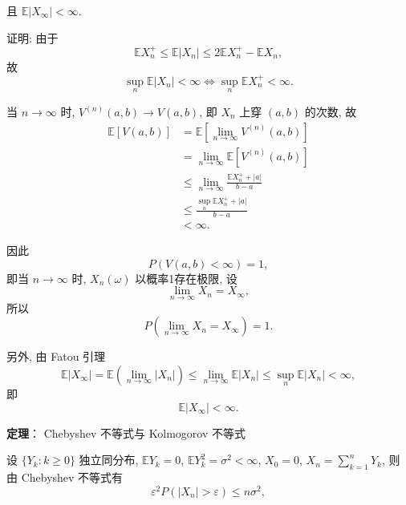 \documentclass[openany]{ctexbook}
\theoremstyle{kaiti}
\theoremstyle{normal}
\begin{document}
且 $\mathbb{E}|X_\infty|<\infty$.

证明: 由于
\begin{equation}
  \mathbb{E}X_n^+\leqslant \mathbb{E}|X_n|\leqslant 2\mathbb{E}X_n^+-\mathbb{E}X_n,
\end{equation}
故
\begin{equation}
  \sup_n\mathbb{E}|X_n|<\infty\Leftrightarrow\sup_n\mathbb{E}X_n^+<\infty.
\end{equation}

当 $n\to\infty$ 时, $V^{(n)}(a,b)\to V(a,b)$, 即 $X_n$ 上穿 $(a,b)$ 的次数, 故
\begin{equation}
  \begin{aligned}
    \mathbb{E}[V(a,b)]
    &=\mathbb{E}\left[\lim_{n\to\infty}V^{(n)}(a,b)\right]\\
    &=\lim_{n\to\infty}\mathbb{E}\left[V^{(n)}(a,b)\right]\\
    &\leqslant \lim_{n\to\infty}\frac{\mathbb{E}X_n^++|a|}{b-a}\\
    &\leqslant\frac{\sup_{n}\mathbb{E}X_n^++|a|}{b-a}\\
    &<\infty.
  \end{aligned}
\end{equation}

因此
\begin{equation}
  P(V(a,b)<\infty)=1,
\end{equation}
即当 $n\to\infty$ 时, $X_n(\omega)$ 以概率1存在极限, 设
\begin{equation}
  \lim_{n\to\infty}X_n=X_\infty,
\end{equation}
所以
\begin{equation}
  P\left(\lim_{n\to\infty}X_n=X_\infty\right)=1.
\end{equation}

另外, 由 Fatou 引理
\begin{equation}
  \mathbb{E}|X_\infty|=\mathbb{E}\left(\lim_{n\to\infty}|X_n|\right)\leqslant\lim_{n\to\infty}\mathbb{E}|X_n|\leqslant\sup_n\mathbb{E}|X_n|<\infty,
\end{equation}
即
\begin{equation}
  \mathbb{E}|X_\infty|<\infty.
\end{equation}

\textbf{定理}： Chebyshev 不等式与 Kolmogorov 不等式

设 $\{Y_k:k\geqslant0\}$ 独立同分布, $\mathbb{E}Y_k=0$, $\mathbb{E}Y_k^2=\sigma^2<\infty$, $X_0=0$, $X_n=\sum_{k=1}^nY_k$, 则由 Chebyshev 不等式有
\begin{equation}
  \varepsilon^2P(|X_n|>\varepsilon)\leqslant n\sigma^2,
\end{equation}
\end{document}

